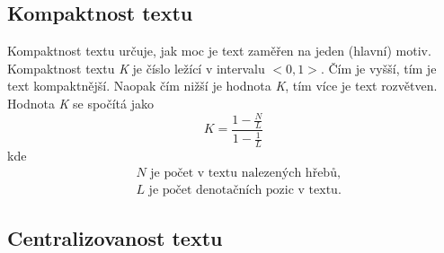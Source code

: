 \subsection{Kompaktnost textu}
Kompaktnost textu určuje, jak moc je text zaměřen na jeden (hlavní) motiv. Kompaktnost textu \textit{K} je číslo ležící v intervalu $<0,1>$. Čím je vyšší, tím je text kompaktnější. Naopak čím nižší je hodnota \textit{K}, tím více je text rozvětven. Hodnota \textit{K} se spočítá jako
\begin{equation}
K=\frac{1-\frac{N}{L}}{1-\frac{1}{L}}
\end{equation}
kde 
\begin{align*}
      & N\text{ je počet v textu nalezených hřebů,}\\
      & L\text{ je počet denotačních pozic v textu.}
\end{align*}     

\subsection{Centralizovanost textu}


